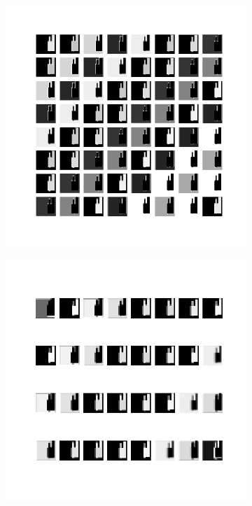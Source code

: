 \begin{figure}
    \centering
    \begin{subfigure}[b]{0.40\linewidth}
        \includegraphics[width=\linewidth]{images/cae_online_lstm/caelstm_section_cae_training_block_map_10000_model_feature_maps_map_0_0_3.png}
    \end{subfigure}
    \hfill
    \begin{subfigure}[b]{0.40\linewidth}
        \includegraphics[width=\linewidth]{images/cae_online_lstm/caelstm_section_cae_training_block_map_10000_model_feature_maps_map_0_0_2.png}

\end{subfigure}
\end{figure}
